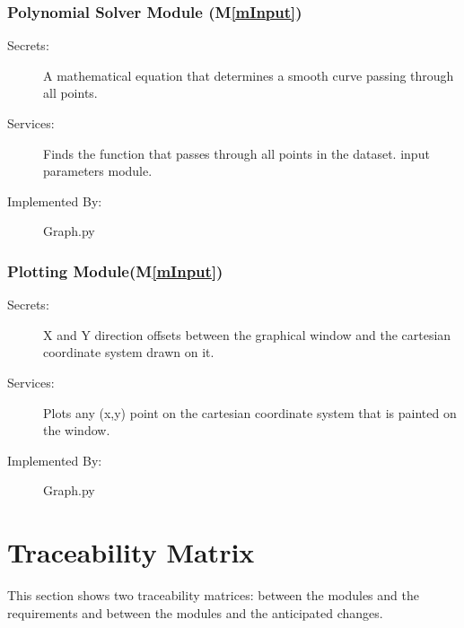 \documentclass[12pt, titlepage]{article}
\newcommand{\mref}[1]{M\ref{#1}}
\begin{document}
\subsubsection{Polynomial Solver Module (\mref{mInput})}
\begin{description}
\item[Secrets:]A mathematical equation that determines a smooth curve passing through all points.
\item[Services:]Finds the function that passes through all points in the dataset. 
  input parameters module.
\item[Implemented By:] Graph.py
\end{description}

\subsubsection{Plotting Module(\mref{mInput})}
\begin{description}
\item[Secrets:] X and Y direction offsets between the graphical window and the cartesian coordinate system drawn on it.
\item[Services:]Plots any (x,y) point on the cartesian coordinate system that is painted on the window. 
\item[Implemented By:] Graph.py
\end{description}

\section{Traceability Matrix} \label{SecTM}%

This section shows two traceability matrices: between the modules and the
requirements and between the modules and the anticipated changes.
\end{document}
